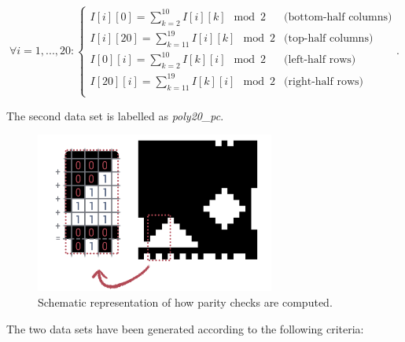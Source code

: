 \begin{equation}
\label{eq:parity_check}
\forall i = 1, ..., 20: 
\begin{cases}
     I[i][0] = \sum\limits_{k=2}^{10} I[i][k] \mod 2 & \text{(bottom-half columns)} \\
     I[i][20] = \sum\limits_{k=11}^{19} I[i][k] \mod 2 & \text{(top-half columns)} \\
     I[0][i] = \sum\limits_{k=2}^{10} I[k][i] \mod 2 & \text{(left-half rows)} \\
     I[20][i] = \sum\limits_{k=11}^{19} I[k][i] \mod 2 & \text{(right-half rows)} \\
\end{cases}.
\end{equation}

The second data set is labelled as \textit{poly20\_pc}.

\begin{figure}[ht]
    \centering
    \includegraphics[width=0.7\textwidth]{pc_zoom}
    \caption{Schematic representation of how parity checks are computed.}
\end{figure}

The two data sets have been generated according to the following criteria:

